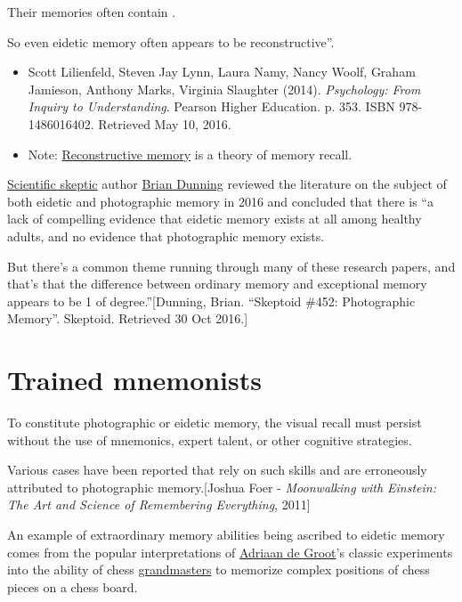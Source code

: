 \documentclass{book}
\numberwithin{equation}{section}
\begin{document}

Their memories often contain .

So even eidetic memory often appears to be reconstructive''.
\begin{itemize}
    \item Scott Lilienfeld, Steven Jay Lynn, Laura Namy, Nancy Woolf, Graham Jamieson, Anthony Marks, Virginia Slaughter (2014). \textit{Psychology: From Inquiry to Understanding}. Pearson Higher Education. p. 353. ISBN 978-1486016402. Retrieved May 10, 2016.
    \item Note: \href{https://en.wikipedia.org/wiki/Reconstructive_memory}{Reconstructive memory} is a theory of memory recall.
\end{itemize}
%
\href{https://en.wikipedia.org/wiki/Skeptical_movement}{Scientific skeptic} author \href{https://en.wikipedia.org/wiki/Brian_Dunning_(author)}{Brian Dunning} reviewed the literature on the subject of both eidetic and photographic memory in 2016 and concluded that there is ``a lack of compelling evidence that eidetic memory exists at all among healthy adults, and no evidence that photographic memory exists.

But there's a common theme running through many of these research papers, and that's that the difference between ordinary memory and exceptional memory appears to be 1 of degree.''[Dunning, Brian. ``Skeptoid \#452: Photographic Memory''. Skeptoid. Retrieved 30 Oct 2016.]

\section{Trained mnemonists}
To constitute photographic or eidetic memory, the visual recall must persist without the use of mnemonics, expert talent, or other cognitive strategies.

Various cases have been reported that rely on such skills and are erroneously attributed to photographic memory.[Joshua Foer - \textit{Moonwalking with Einstein: The Art and Science of Remembering Everything}, 2011]

%
An example of extraordinary memory abilities being ascribed to eidetic memory comes from the popular interpretations of \href{https://en.wikipedia.org/wiki/Adriaan_de_Groot}{Adriaan de Groot}'s classic experiments into the ability of chess \href{https://en.wikipedia.org/wiki/Grandmaster_(chess)}{grandmasters} to memorize complex positions of chess pieces on a chess board.
\end{document}
